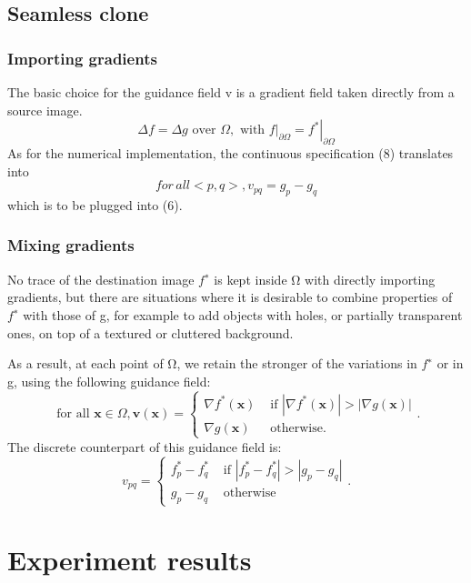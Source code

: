 \documentclass[10pt, a4paper]{article}%
\begin{document}
\subsection{Seamless clone}
\subsubsection{Importing gradients}
The basic choice for the guidance field v is a gradient field taken directly from a source image. 
\begin{equation}
    \Delta f=\Delta g \text { over } \Omega, \text { with }\left.f\right|_{\partial \Omega}=\left.f^*\right|_{\partial \Omega}
\end{equation}
As for the numerical implementation, the continuous specification (8) translates into
\begin{equation}
    for\,all <p,q>, v_{pq}=g_p-g_q
\end{equation}
which is to be plugged into (6).
\subsubsection{Mixing gradients}
 No trace of the destination image $f^∗$ is kept inside Ω with directly importing gradients, but there are situations where it is desirable to combine properties of $f^∗$ with those of g, for example to add objects with holes, or partially transparent ones, on top of a textured or cluttered background.
 
 As a result, at each point of Ω, we retain the stronger of the variations in $f^∗$ or in g, using the following guidance field:
 \begin{equation}
     \text { for all } \mathbf{x} \in \Omega, \mathbf{v}(\mathbf{x})= \begin{cases}\nabla f^*(\mathbf{x}) & \text { if }\left|\nabla f^*(\mathbf{x})\right|>|\nabla g(\mathbf{x})| \\ \nabla g(\mathbf{x}) & \text { otherwise. }\end{cases}.
 \end{equation}
 The discrete counterpart of this guidance field is:
 \begin{equation}
     v_{p q}= \begin{cases}f_p^*-f_q^* & \text { if }\left|f_p^*-f_q^*\right|>\left|g_p-g_q\right| \\ g_p-g_q & \text { otherwise }\end{cases}.
 \end{equation}
\newpage
 \section{Experiment results}
\end{document}
